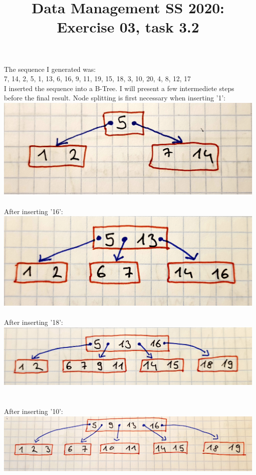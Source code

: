 \documentclass{article}
\title {Data Management SS 2020: Exercise 03, task 3.2}
\date {}
\begin{document}
\maketitle

The sequence I generated was: \\ 7, 14, 2, 5, 1, 13, 6, 16, 9, 11, 19, 15, 18, 3, 10, 20, 4, 8, 12, 17 \\
I inserted the sequence into a B-Tree. I will present a few intermediete steps before the final result. 
Node splitting is first necessary when inserting '1': \\

\includegraphics[scale = 0.1]{ins1}
\\ \\
After inserting '16': \\ 
\includegraphics[scale = 0.1]{ins16}
\\ \\
After inserting '18': \\ 
\includegraphics[scale = 0.1]{ins18}
\\ \\ \\ 
After inserting '10': \\ 
\includegraphics[scale = 0.1]{ins10}
\end{document}
